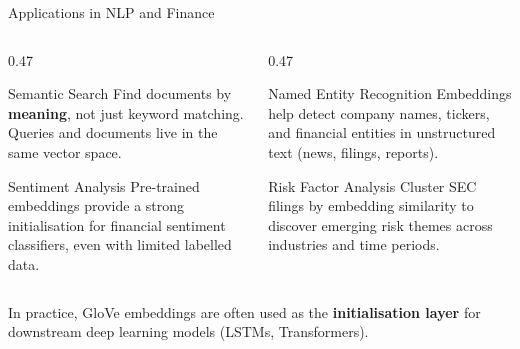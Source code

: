 \documentclass[11pt,aspectratio=169,professionalfonts]{beamer}
\begin{document}
\begin{frame}{Applications in NLP and Finance}
  \begin{columns}[T]
    \begin{column}{0.47\textwidth}
      \begin{block}{Semantic Search}
        Find documents by \textbf{meaning}, not just keyword matching. Queries and documents live in the same vector space.
      \end{block}
      \vspace{4pt}
      \begin{block}{Sentiment Analysis}
        Pre-trained embeddings provide a strong initialisation for financial sentiment classifiers, even with limited labelled data.
      \end{block}
    \end{column}
    \begin{column}{0.47\textwidth}
      \begin{block}{Named Entity Recognition}
        Embeddings help detect company names, tickers, and financial entities in unstructured text (news, filings, reports).
      \end{block}
      \vspace{4pt}
      \begin{block}{Risk Factor Analysis}
        Cluster SEC filings by embedding similarity to discover emerging risk themes across industries and time periods.
      \end{block}
    \end{column}
  \end{columns}

  \vspace{6pt}
  In practice, GloVe embeddings are often used as the \textbf{initialisation layer} for downstream deep learning models (LSTMs, Transformers).
\end{frame}
%
%
\end{document}
